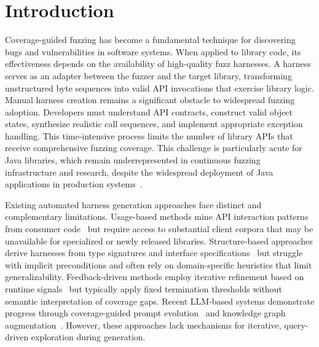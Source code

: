 \section{Introduction}

Coverage-guided fuzzing has become a fundamental technique for discovering bugs and vulnerabilities in software systems. When applied to library code, its effectiveness depends on the availability of high-quality fuzz harnesses. A harness serves as an adapter between the fuzzer and the target library, transforming unstructured byte sequences into valid API invocations that exercise library logic. Manual harness creation remains a significant obstacle to widespread fuzzing adoption. Developers must understand API contracts, construct valid object states, synthesize realistic call sequences, and implement appropriate exception handling. This time-intensive process limits the number of library APIs that receive comprehensive fuzzing coverage. This challenge is particularly acute for Java libraries, which remain underrepresented in continuous fuzzing infrastructure and research, despite the widespread deployment of Java applications in production systems~\cite{oss-fuzz-gen}. 

Existing automated harness generation approaches face distinct and complementary limitations. Usage-based methods mine API interaction patterns from consumer code~\cite{DBLP:conf/sigsoft/BabicBCIKKLSW19:FUDGE,DBLP:conf/sp/JeongJYMKJKSH23:UTopia} but require access to substantial client corpora that may be unavailable for specialized or newly released libraries. Structure-based approaches derive harnesses from type signatures and interface specifications~\cite{DBLP:conf/icse/GreenA22:GraphFuzz,DBLP:conf/icse/ShermanN25:OGHarn} but struggle with implicit preconditions and often rely on domain-specific heuristics that limit generalizability. Feedback-driven methods employ iterative refinement based on runtime signals~\cite{DBLP:conf/uss/ZhangLZZZZXLL0H23:Rubick} but typically apply fixed termination thresholds without semantic interpretation of coverage gaps. Recent LLM-based systems demonstrate progress through coverage-guided prompt evolution~\cite{DBLP:conf/ccs/LyuXCC24:PromptFuzz} and knowledge graph augmentation~\cite{DBLP:conf/icse/XuMZZCHLW25:CKGFuzzer}. However, these approaches lack mechanisms for iterative, query-driven exploration during generation. 

